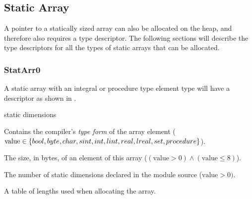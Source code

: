 \subsection{Static Array}
A pointer to a statically sized array can also be allocated on the
heap, and therefore also requires a type descriptor.  The following
sections will describe the type descriptors for all the types of
static arrays that can be allocated.

\subsubsection{StatArr0}\label{memlay:td-statarr0}

A static array with an integral or procedure type element type will
have a descriptor as shown in .

\begin{TDfields}{static dimensions}
  \item[flags] 

  \item[element type] Contains the compiler's \emph{type form} of the
    array element ($\textrm{value} \in \left\lbrace bool, byte, char, sint, int, lint,
      real, lreal, set, procedure \right\rbrace$).

  \item[element size]  The size, in bytes, of an element of this array
    ($(\textrm{value} > 0) \wedge (\textrm{value} \leq 8)$).

  \item[static dimensions] The number of static dimensions declared in
    the module source ($\textrm{value} > 0)$.

  \item[\texttt{LEN(x, i)}] A table of lengths used when allocating
    the array.
\end{TDfields}

